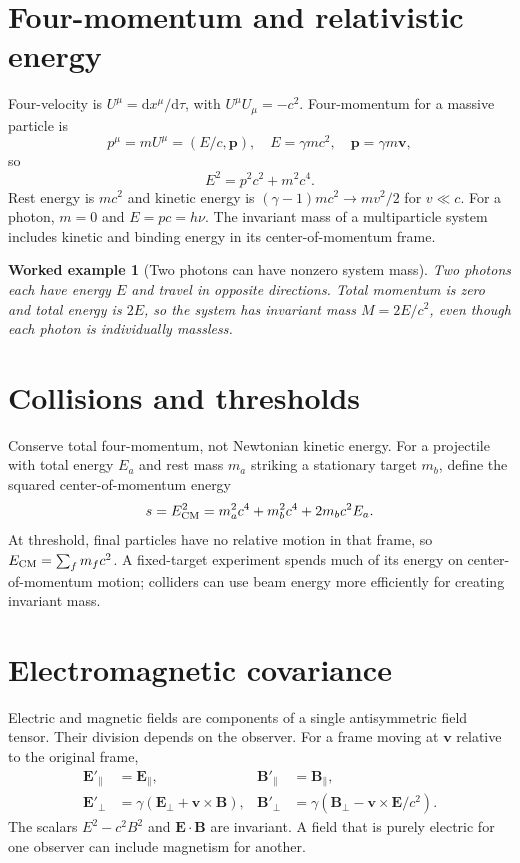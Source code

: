 \documentclass[11pt,oneside]{book}
\newcommand{\dd}{\mathrm{d}}
\newcommand{\vect}[1]{\boldsymbol{#1}}
\theoremstyle{reviewstyle}
\newtheorem{example}{Worked example}[chapter]
\begin{document}
\section{Four-momentum and relativistic energy}
Four-velocity is $U^\mu=\dd x^\mu/\dd\tau$, with $U^\mu U_\mu=-c^2$. Four-momentum for a massive particle is
\begin{equation}
p^\mu=mU^\mu=(E/c,\vect p),\quad
E=\gamma mc^2,\quad \vect p=\gamma m\vect v,
\end{equation}
so
\begin{equation}\boxed{E^2=p^2c^2+m^2c^4.}\end{equation}
Rest energy is $mc^2$ and kinetic energy is $(\gamma-1)mc^2\to mv^2/2$ for $v\ll c$. For a photon, $m=0$ and $E=pc=h\nu$. The invariant mass of a multiparticle system includes kinetic and binding energy in its center-of-momentum frame.
\begin{example}[Two photons can have nonzero system mass]
Two photons each have energy $E$ and travel in opposite directions. Total momentum is zero and total energy is $2E$, so the system has invariant mass $M=2E/c^2$, even though each photon is individually massless.
\end{example}
\section{Collisions and thresholds}
Conserve total four-momentum, not Newtonian kinetic energy. For a projectile with total energy $E_a$ and rest mass $m_a$ striking a stationary target $m_b$, define the squared center-of-momentum energy
\begin{equation}s=E_{\rm CM}^2=m_a^2c^4+m_b^2c^4+2m_bc^2E_a.\end{equation}
At threshold, final particles have no relative motion in that frame, so $E_{\rm CM}=\sum_fm_fc^2$. A fixed-target experiment spends much of its energy on center-of-momentum motion; colliders can use beam energy more efficiently for creating invariant mass.
\section{Electromagnetic covariance}
Electric and magnetic fields are components of a single antisymmetric field tensor. Their division depends on the observer. For a frame moving at $\vect v$ relative to the original frame,
\begin{align}
\vect E'_\parallel&=\vect E_\parallel,&\vect B'_\parallel&=\vect B_\parallel,\\
\vect E'_\perp&=\gamma(\vect E_\perp+\vect v\times\vect B),&
\vect B'_\perp&=\gamma(\vect B_\perp-\vect v\times\vect E/c^2).
\end{align}
The scalars $E^2-c^2B^2$ and $\vect E\cdot\vect B$ are invariant. A field that is purely electric for one observer can include magnetism for another.
\end{document}
